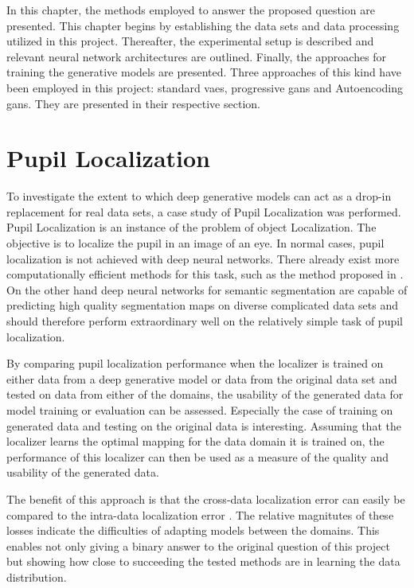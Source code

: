 In this chapter, the methods employed to answer the proposed question are presented. This chapter begins by establishing the data sets and data processing utilized in this project. Thereafter, the experimental setup is described and relevant neural network architectures are outlined. Finally, the approaches for training the generative models are presented. Three approaches of this kind have been employed in this project: standard \acrshort{vaes}, progressive \acrshort{gans} and Autoencoding \acrshort{gans}. They are presented in their respective section.

\section{Pupil Localization}
To investigate the extent to which deep generative models can act as a drop-in replacement for real data sets, a case study of Pupil Localization was performed. Pupil Localization is an instance of the problem of object Localization. The objective is to localize the pupil in an image of an eye. In normal cases, pupil localization is not achieved with deep neural networks. There already exist more computationally efficient methods for this task, such as the method proposed in \parencite{markuvs2014eye}. On the other hand deep neural networks for semantic segmentation are capable of predicting high quality segmentation maps on diverse complicated data sets \parencite{ChenPK0Y16semantic} and should therefore perform extraordinary well on the relatively simple task of pupil localization.

By comparing pupil localization performance when the localizer is trained on either data from a deep generative model or data from the original data set and tested on data from either of the domains, the usability of the generated data for model training or evaluation can be assessed. Especially the case of training on generated data and testing on the original data is interesting. Assuming that the localizer learns the optimal mapping for the data domain it is trained on, the performance of this localizer can then be used as a measure of the quality and usability of the generated data. 

The benefit of this approach is that the cross-data localization error can easily be compared to the intra-data localization error . The relative magnitutes of these losses indicate the difficulties of adapting models between the domains. This enables not only giving a binary answer to the original question of this project but showing how close to succeeding the tested methods are in learning the data distribution.

